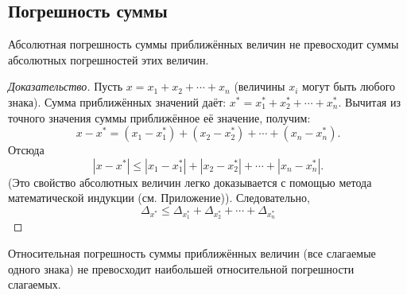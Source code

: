 \subsection{Погрешность суммы}
\begin{theorem}
	Абсолютная погрешность суммы приближённых величин не превосходит суммы
	абсолютных погрешностей этих величин.
	\label{thm:abs_max_inaccuracy}
\end{theorem}
\begin{proof}[Доказательство]
	Пусть $x = x_1 + x_2 + \cdots + x_n$ (величины $x_i$ могут быть любого
	знака). Сумма приближённых значений даёт: $x^* = x^*_1 + x^*_2 + \cdots
	+ x^*_n$.
	Вычитая из точного значения суммы приближённое её значение, получим:
	$$x - x^* = (x_1 - x^*_1) + (x_2 - x^*_2) + \cdots + (x_n - x^*_n).$$
	Отсюда
	$$|x - x^*| \leq |x_1 - x^*_1| + |x_2 - x^*_2| + \cdots + |x_n - x^*_n|.$$
	(Это свойство абсолютных величин легко доказывается с помощью метода
	математической индукции (см. Приложение)). Следовательно,
	\begin{equation}
		\Delta_{x^*} \leq \Delta_{x^*_1} + \Delta_{x^*_2} + \cdots +
		\Delta_{x^*_n}
	\end{equation}
\end{proof}
\begin{theorem}
	Относительная погрешность суммы приближённых величин (все слагаемые
	одного знака) не превосходит наибольшей относительной погрешности
	слагаемых.
\end{theorem}
